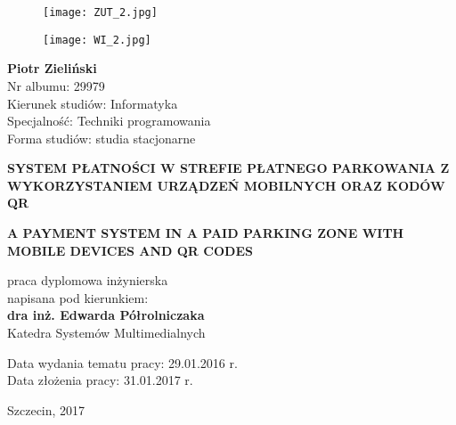 \begin{titlepage}
	\begin{figure}[!htb]
		\begin{minipage}{0.48\textwidth}
			\raggedright
			\texttt{[image: ZUT\_2.jpg]}
		\end{minipage}\hfill
		\begin{minipage}{0.48\textwidth}
			\raggedleft
			\texttt{[image: WI\_2.jpg]}
		\end{minipage}
	\end{figure}
	\vspace{2.5cm}
	\begin{onehalfspacing}
	\begin{center}
		\textbf{{\large Piotr Zieliński}}\\
		Nr albumu: 29979\\
		Kierunek studiów: Informatyka\\
		Specjalność: Techniki programowania\\
		Forma studiów: studia stacjonarne
	\end{center}
	\vspace{1.5cm}
	\begin{center}
		\textbf{\large SYSTEM PŁATNOŚCI W STREFIE PŁATNEGO PARKOWANIA Z WYKORZYSTANIEM URZĄDZEŃ MOBILNYCH ORAZ KODÓW QR}
	\end{center}
	\begin{center}
		\textbf{\large A PAYMENT SYSTEM IN A PAID PARKING ZONE WITH MOBILE DEVICES AND QR CODES}
	\end{center}
	\begin{center}
		praca dyplomowa inżynierska\\
		napisana pod kierunkiem:\\
		\textbf{{\large dra inż. Edwarda Półrolniczaka}}\\
		Katedra Systemów Multimedialnych
	\end{center}
	\vspace{1.5cm}
	{\footnotesize Data wydania tematu pracy: 29.01.2016 r.}\\
	{\footnotesize Data złożenia pracy: 31.01.2017 r.}
	
	\vspace{.5cm}
	
	\end{onehalfspacing}
	
	\begin{center}
		Szczecin, 2017
	\end{center}

\end{titlepage}